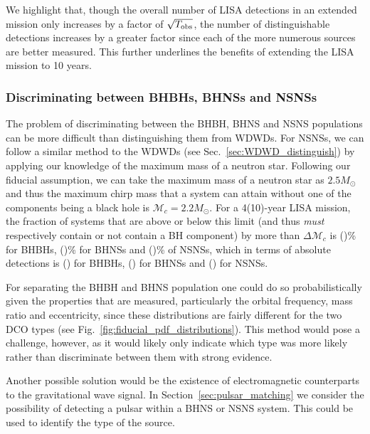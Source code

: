 We highlight that, though the overall number of LISA detections in an extended mission only increases by a factor of $\sqrt{T_{\rm obs}}$, the number of distinguishable detections increases by a greater factor since each of the more numerous sources are better measured. This further underlines the benefits of extending the LISA mission to 10 years.

\subsubsection{Discriminating between BHBHs, BHNSs and NSNSs}

The problem of discriminating between the BHBH, BHNS and NSNS populations can be more difficult than distinguishing them from WDWDs. For NSNSs, we can follow a similar method to the WDWDs (see Sec.~\ref{sec:WDWD_distinguish}) by applying our knowledge of the maximum mass of a neutron star. Following our fiducial assumption, we can take the maximum mass of a neutron star as $2.5 \unit{M_{\odot}}$ and thus the maximum chirp mass that a system can attain without one of the components being a black hole is $\mathcal{M}_{c} = 2.2 \unit{M_\odot}$. For a 4(10)-year LISA mission, the fraction of systems that are above or below this limit (and thus \textit{must} respectively contain or not contain a BH component) by more than $\Delta \mathcal{M}_c$ is \BHBHEitherBHOrNSFourPerc{}(\BHBHEitherBHOrNSTenPerc{})\% for BHBHs, \BHNSEitherBHOrNSFourPerc{}(\BHNSEitherBHOrNSTenPerc{})\% for BHNSs and \NSNSEitherBHOrNSFourPerc{}(\NSNSEitherBHOrNSTenPerc{})\% of NSNSs, which in terms of absolute detections is \BHBHEitherBHOrNSFour{}(\BHBHEitherBHOrNSTen{}) for BHBHs, \BHNSEitherBHOrNSFour{}(\BHNSEitherBHOrNSTen{}) for BHNSs and \NSNSEitherBHOrNSFour{}(\NSNSEitherBHOrNSTen{}) for NSNSs.

For separating the BHBH and BHNS population one could do so probabilistically given the properties that are measured, particularly the orbital frequency, mass ratio and eccentricity, since these distributions are fairly different for the two DCO types (see Fig.~\ref{fig:fiducial_pdf_distributions}). This method would pose a challenge, however, as it would likely only indicate which type was more likely rather than discriminate between them with strong evidence.

Another possible solution would be the existence of electromagnetic counterparts to the gravitational wave signal. In Section~\ref{sec:pulsar_matching} we consider the possibility of detecting a pulsar within a BHNS or NSNS system. This could be used to identify the type of the source.

